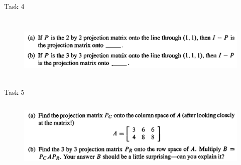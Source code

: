 \documentclass[aspectratio=169]{beamer}
\begin{document}
\begin{frame}[t]{Task 4}
    \framesubtitle{}
    \begin{figure}[H]
        \centering\includegraphics[height=3cm,width=1\textwidth,keepaspectratio]{4.png}
        \label{fig:4.png}
    \end{figure}
\end{frame}

\begin{frame}[t]{Task 5}
    \framesubtitle{}
    \begin{figure}[H]
        \centering\includegraphics[height=3cm,width=1\textwidth,keepaspectratio]{5.png}
        \label{fig:5.png}
    \end{figure}
\end{frame}
\end{document}
